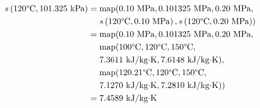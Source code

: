 
\begin{align}
s\left(
120\text{\textdegree C},
101.325 \text{ kPa}
\right) 
&= 
\text{map}(
0.10 \text{ MPa},
0.101325 \text{ MPa},
0.20 \text{ MPa}, \nonumber \\
& \phantom{=.} 
s\left(
120\text{\textdegree C},
0.10 \text{ MPa}
\right),
s\left(
120\text{\textdegree C},
0.20 \text{ MPa}
\right)
) \nonumber \\
&= 
\text{map}(
0.10 \text{ MPa},
0.101325 \text{ MPa},
0.20 \text{ MPa}, \nonumber \\
& \phantom{=.}
\text{map}(
100\text{\textdegree C},
120\text{\textdegree C},
150\text{\textdegree C}, \nonumber \\
& \phantom{=.} 
7.3611 \text{ kJ/kg$\cdot$K},
7.6148 \text{ kJ/kg$\cdot$K}
), \nonumber \\
& \phantom{=.}
\text{map}(
120.21\text{\textdegree C},
120\text{\textdegree C},
150\text{\textdegree C}, \nonumber \\
& \phantom{=.} 
7.1270 \text{ kJ/kg$\cdot$K},
7.2810 \text{ kJ/kg$\cdot$K}
) 
) \nonumber \\
&= 7.4589 \text{ kJ/kg$\cdot$K} \nonumber
\end{align}